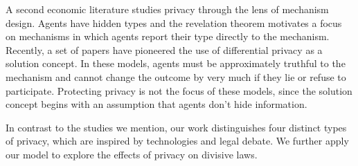 A second economic literature studies privacy through the lens of mechanism design.  Agents have hidden types and the revelation theorem motivates a focus on mechanisms in which agents report their type directly to the mechanism.  Recently, a set of papers have pioneered the use of differential privacy as a solution concept.  In these models, agents must be approximately truthful to the mechanism and cannot change the outcome by very much if they lie or refuse to participate.  Protecting privacy is not the focus of these models, since the solution concept begins with an assumption that agents don't hide information.

In contrast to the studies we mention, our work distinguishes four distinct types of privacy, which are inspired by technologies and legal debate.  We further apply our model to explore the effects of privacy on divisive laws.

